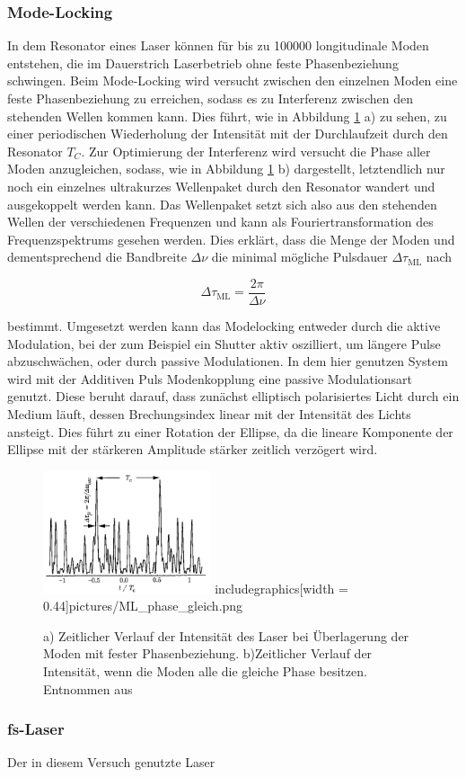     \subsubsection{Mode-Locking}
      In dem Resonator eines Laser können für bis zu 100000 longitudinale Moden entstehen, die im Dauerstrich Laserbetrieb ohne feste Phasenbeziehung schwingen. Beim Mode-Locking wird versucht zwischen den 
      einzelnen Moden eine feste Phasenbeziehung zu erreichen, sodass es zu Interferenz zwischen den stehenden Wellen kommen kann. Dies führt, wie in Abbildung \ref{fig:Modelocking} a) zu sehen, zu einer 
      periodischen Wiederholung der Intensität mit der Durchlaufzeit durch den Resonator $T_C$. Zur Optimierung der Interferenz wird versucht die Phase aller Moden anzugleichen, sodass, wie in 
      Abbildung \ref{fig:Modelocking} b) dargestellt, letztendlich nur noch ein einzelnes ultrakurzes Wellenpaket durch den Resonator wandert und ausgekoppelt werden kann. Das Wellenpaket setzt sich also
      aus den stehenden Wellen der verschiedenen Frequenzen und kann als Fouriertransformation des Frequenzspektrums gesehen werden. Dies erklärt, dass die Menge der Moden und dementsprechend die 
      Bandbreite $\Delta\nu$ die minimal mögliche Pulsdauer $\Delta\tau_{\text{ML}}$ nach

      \begin{equation*}
        \Delta\tau_{\text{ML}} = \frac{2\pi}{\Delta\nu}
      \end{equation*}

      bestimmt. 
      Umgesetzt werden kann das Modelocking entweder durch die aktive Modulation, bei der zum Beispiel ein Shutter aktiv oszilliert, um längere Pulse abzuschwächen, oder durch passive Modulationen. In dem hier 
      genutzen System wird mit der Additiven Puls Modenkopplung eine passive Modulationsart genutzt. Diese beruht darauf, dass zunächst elliptisch polarisiertes Licht durch ein Medium läuft, dessen 
      Brechungsindex linear mit der Intensität des Lichts ansteigt. Dies führt zu einer Rotation der Ellipse, da die lineare Komponente der Ellipse mit der stärkeren Amplitude stärker zeitlich verzögert wird.

      \FloatBarrier
      \begin{figure}[h]
        \centering
        \includegraphics[width = 0.44\textwidth]{pictures/ML_phase_const.png}
        includegraphics[width = 0.44\textwidth]{pictures/ML_phase_gleich.png}
        \caption{a) Zeitlicher Verlauf der Intensität des Laser bei Überlagerung der Moden mit fester Phasenbeziehung. b)Zeitlicher Verlauf der Intensität, wenn die Moden alle die gleiche Phase besitzen. Entnommen aus \cite{tu_dortmund_versuchsanleitung_nodate}}
        \label{fig:Modelocking}
      \end{figure}
      \FloatBarrier
      
      
    \subsubsection{fs-Laser}
      Der in diesem Versuch genutzte Laser 
  
